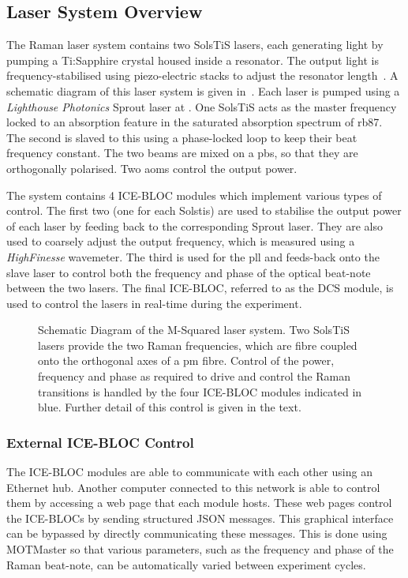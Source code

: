\subsection{Laser System Overview}
\label{subsec:msquared_overview} The Raman laser system contains two
SolsTiS lasers, each generating  light by pumping a Ti:Sapphire crystal housed inside a resonator.
The output light is frequency-stabilised using piezo-electric stacks to adjust
the resonator length~\cite{Drever1983}. A schematic diagram of this laser system is given
in~. Each laser is pumped using a
 \textit{Lighthouse Photonics} Sprout laser at
. One SolsTiS acts as the master frequency locked
to an absorption feature in the saturated absorption spectrum of
\ac{rb87}. The second is slaved to this using a phase-locked loop to keep their
beat frequency constant. The two beams are mixed on a
\ac{pbs}, so that they are orthogonally polarised. Two \acp{aom} control the
output power. 
\par\noindent 
The system contains 4 ICE-BLOC modules which implement various types of control. The
first two (one for each Solstis) are used to stabilise the output power of each
laser by feeding back to the corresponding Sprout laser. They are also used to
coarsely adjust the output frequency, which is measured using a
\textit{HighFinesse} wavemeter. The third is used for the \ac{pll}
and feeds-back onto the slave laser to control both the frequency and phase of
the optical beat-note between the two lasers. The final ICE-BLOC, referred to
as the DCS module, is used to control the lasers in real-time during the
experiment.  
\begin{figure}
	\centering \fontsize{10pt}{10pt}
	\resizebox{0.8\textwidth}{!}{}
	\caption[M-Squared Laser System Schematic]{Schematic Diagram of the M-Squared
		laser system. Two SolsTiS lasers provide the two Raman frequencies, which
		are fibre coupled onto the orthogonal axes of a \ac{pm} fibre. Control of
		the power, frequency and phase as required to drive and control
    the Raman transitions is
		handled by the four ICE-BLOC modules indicated in blue. Further detail of
		this control is given in the text.} \label{fig:msquared_laser}
\end{figure}

\subsubsection{External ICE-BLOC Control}
The ICE-BLOC modules are able to communicate with each other using an Ethernet
hub. Another computer connected to this network is able to control them by
accessing a web page that each module hosts. These web pages control the ICE-BLOCs
by sending structured JSON messages. This graphical interface can be bypassed by
directly communicating these messages. This is done using MOTMaster so that
various parameters, such as the frequency and phase of the Raman beat-note, can
be automatically varied between experiment cycles. 
